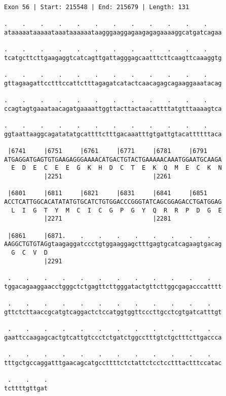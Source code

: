 \documentclass{article}
\begin{document}
\begin{Verbatim}
Exon 56 | Start: 215548 | End: 215679 | Length: 131
 
.    .    .    .    .    .    .    .    .    .    .    .    
ataaaaataaaaataaataaaaaataagggaaggagaagagagaaaaggcatgatcagaa
  
.    .    .    .    .    .    .    .    .    .    .    .    
tcatgcttcttgaagaggtcatcagttgattagggagcaatttcttcaagttcaaaggtg
  
.    .    .    .    .    .    .    .    .    .    .    .    
gttagaagattcctttccattctttagagatcatactcaacagagcagaaggaaatacag
  
.    .    .    .    .    .    .    .    .    .    .    .    
ccagtagtgaaataacagatgaaaattggttacttactaacattttatgtttaaaagtca
  
.    .    .    .    .    .    .    .    .    .    .    .    
ggtaattaaggcagatatatgcattttctttgacaaatttgtgattgtacattttttaca
  
 |6741     |6751     |6761     |6771     |6781     |6791    
ATGAGGATGAGTGTGAAGAGGGAAAACATGACTGTACTGAAAAACAAATGGAATGCAAGA
  E  D  E  C  E  E  G  K  H  D  C  T  E  K  Q  M  E  C  K  N
           |2251                         |2261              
  
 |6801     |6811     |6821     |6831     |6841     |6851    
ACCTCATTGGCACATATATGTGCATCTGTGGACCCGGGTATCAGCGGAGACCTGATGGAG
  L  I  G  T  Y  M  C  I  C  G  P  G  Y  Q  R  R  P  D  G  E
           |2271                         |2281              
  
 |6861     |6871.    .    .    .    .    .    .    .    .   
AAGGCTGTGTAGgtaagaggatccctgtggaaggagctttgagtgcatcagaagtgacag
  G  C  V  D                                                
           |2291                                            
  
 .    .    .    .    .    .    .    .    .    .    .    .   
tggacagaaggaacctgggctctgagttcttgggatactgttcttggcgagacccatttt
  
 .    .    .    .    .    .    .    .    .    .    .    .   
gttctcttaaccgcatgtcaggactctccatggtggttcccttgcctcgtgatcatttgt
  
 .    .    .    .    .    .    .    .    .    .    .    .   
gaattccaagagcactgtcattgtccctctgatctggcctttgtctgctttcttgaccca
  
 .    .    .    .    .    .    .    .    .    .    .    .   
tttgctgccaggatttgaacagcatgccttttctctattctcctcctttactttccatac
  
 .    .    .
tcttttgttgat
\end{Verbatim}
\newpage
\end{document}
